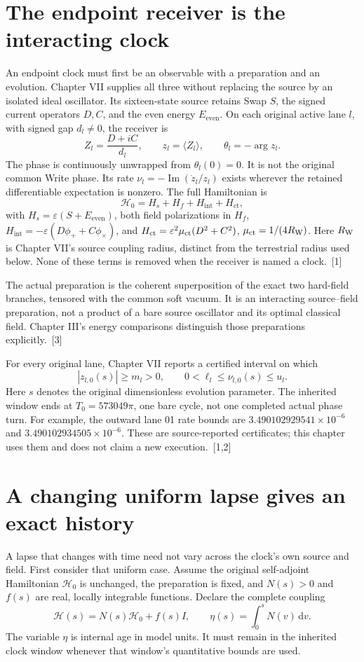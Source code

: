 \documentclass[10pt,twocolumn,letterpaper]{article}
\newcommand{\dd}{\mathrm{d}}
\begin{document}
\section{The endpoint receiver is the interacting clock}
An endpoint clock must first be an observable with a preparation and an evolution. Chapter VII supplies all three without replacing the source by an isolated ideal oscillator. Its sixteen-state source retains Swap $S$, the signed current operators $D,C$, and the even energy $E_{\mathrm{even}}$. On each original active lane $l$, with signed gap $d_l\ne 0$, the receiver is
\[
 Z_l=\frac{D+iC}{d_l},\qquad z_l=\langle Z_l\rangle,
 \qquad\theta_l=-\arg z_l.
\]
The phase is continuously unwrapped from $\theta_l(0)=0$. It is not the original common Write phase. Its rate $\nu_l=-\operatorname{Im}(\dot z_l/z_l)$ exists wherever the retained differentiable expectation is nonzero. The full Hamiltonian is
\[
 \mathcal H_0=H_s+H_f+H_{\mathrm{int}}+H_{\mathrm{ct}},
\]
with $H_s=\varepsilon(S+E_{\mathrm{even}})$, both field polarizations in $H_f$, $H_{\mathrm{int}}=-\varepsilon(D\phi_++C\phi_\times)$, and $H_{\mathrm{ct}}=\varepsilon^2\mu_{\rm ct}(D^2+C^2)$, $\mu_{\rm ct}=1/(4R_{\rm W})$. Here $R_{\rm W}$ is Chapter VII's source coupling radius, distinct from the terrestrial radius used below. None of these terms is removed when the receiver is named a clock.~[1]

The actual preparation is the coherent superposition of the exact two hard-field branches, tensored with the common soft vacuum. It is an interacting source--field preparation, not a product of a bare source oscillator and its optimal classical field. Chapter III's energy comparisons distinguish those preparations explicitly.~[3]

For every original lane, Chapter VII reports a certified interval on which
\[
 |z_{l,0}(s)|\ge m_l>0,\qquad
 0<\ell_l\le\nu_{l,0}(s)\le u_l.
\]
Here $s$ denotes the original dimensionless evolution parameter. The inherited window ends at $T_0=573049\pi$, one bare cycle, not one completed actual phase turn. For example, the outward lane 01 rate bounds are $3.490102929541\times 10^{-6}$ and $3.490102934505\times 10^{-6}$. These are source-reported certificates; this chapter uses them and does not claim a new execution.~[1,2]


\section{A changing uniform lapse gives an exact history}
A lapse that changes with time need not vary across the clock's own source and field. First consider that uniform case. Assume the original self-adjoint Hamiltonian $\mathcal H_0$ is unchanged, the preparation is fixed, and $N(s)>0$ and $f(s)$ are real, locally integrable functions. Declare the complete coupling
\[
 \mathcal H(s)=N(s)\mathcal H_0+f(s)I,
 \qquad\eta(s)=\int_0^sN(v)\,\dd v.
\]
The variable $\eta$ is internal age in model units. It must remain in the inherited clock window whenever that window's quantitative bounds are used.
\end{document}

